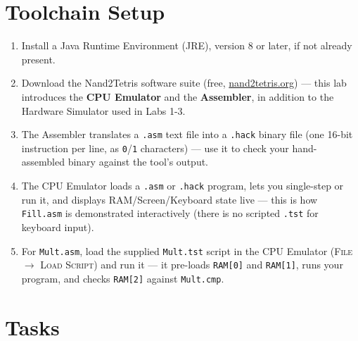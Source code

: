 \documentclass[11pt]{article}
\begin{document}
\section{Toolchain Setup}

\begin{enumerate}
  \item Install a Java Runtime Environment (JRE), version 8 or later, if not already present.
  \item Download the Nand2Tetris software suite (free, \url{nand2tetris.org}) --- this lab introduces the \textbf{CPU Emulator} and the \textbf{Assembler}, in addition to the Hardware Simulator used in Labs 1-3.
  \item The Assembler translates a \texttt{.asm} text file into a \texttt{.hack} binary file (one 16-bit instruction per line, as \texttt{0}/\texttt{1} characters) --- use it to check your hand-assembled binary against the tool's output.
  \item The CPU Emulator loads a \texttt{.asm} or \texttt{.hack} program, lets you single-step or run it, and displays RAM/Screen/Keyboard state live --- this is how \texttt{Fill.asm} is demonstrated interactively (there is no scripted \texttt{.tst} for keyboard input).
  \item For \texttt{Mult.asm}, load the supplied \texttt{Mult.tst} script in the CPU Emulator (\textsc{File} $\to$ \textsc{Load Script}) and run it --- it pre-loads \texttt{RAM[0]} and \texttt{RAM[1]}, runs your program, and checks \texttt{RAM[2]} against \texttt{Mult.cmp}.
\end{enumerate}

\section{Tasks}
\label{sec:tasks}
\end{document}
